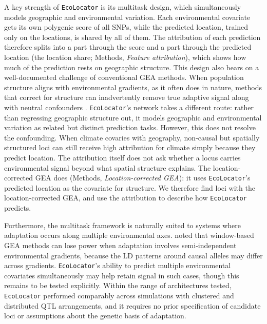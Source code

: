 \documentclass[]{article}
\newcommand{\ecolocator}{\texttt{EcoLocator}\xspace}
\begin{document}
A key strength of \ecolocator is its multitask design, 
which simultaneously models geographic and environmental variation. 
Each environmental covariate gets its own polygenic score of all SNPs,
while the predicted location, trained only on the locations, is shared by all of them.
The attribution of each prediction therefore splits into a part through the score
and a part through the predicted location
(the location share; Methods, \textit{Feature attribution}),
which shows how much of the prediction rests on geographic structure.
This design also bears on a well-documented challenge of conventional GEA methods. 
When population structure aligns with environmental gradients, 
as it often does in nature, methods that correct for
structure can inadvertently remove true adaptive signal along with neutral
confounders \citep{lotterhos_recombination_2019, booker_wza_2024}.
\ecolocator's network takes a different route: rather than regressing geographic structure
out, it models geographic and environmental variation as related but distinct
prediction tasks. However, this does not resolve the confounding. When climate
covaries with geography, non-causal but spatially structured loci can still
receive high attribution for climate simply because they predict location.
The attribution itself does not ask whether a locus carries environmental
signal beyond what spatial structure explains.
The location-corrected GEA does (Methods, \textit{Location-corrected GEA}):
it uses \ecolocator's predicted location as the covariate for structure.
We therefore find loci with the location-corrected GEA,
and use the attribution to describe how \ecolocator predicts.

Furthermore, the multitask framework
is naturally suited to systems
where adaptation occurs along multiple environmental axes.
\citet{booker_wza_2024} noted that window-based GEA methods
can lose power when adaptation involves
semi-independent environmental gradients,
because the LD patterns around causal alleles
may differ across gradients.
\ecolocator's ability to predict multiple environmental covariates
simultaneously may help retain signal in such cases,
though this remains to be tested explicitly.
Within the range of architectures tested,
\ecolocator performed comparably across simulations
with clustered and distributed QTL arrangements,
and it requires no prior specification of candidate loci
or assumptions about the genetic basis of adaptation.
\end{document}
